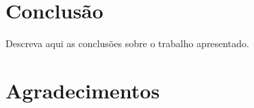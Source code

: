 \documentclass[10pt,conference]{IEEEtran}
\begin{document}


%
%

\section{Conclusão}
Descreva aqui as conclusões sobre o trabalho apresentado.





\section*{Agradecimentos}
\end{document}

